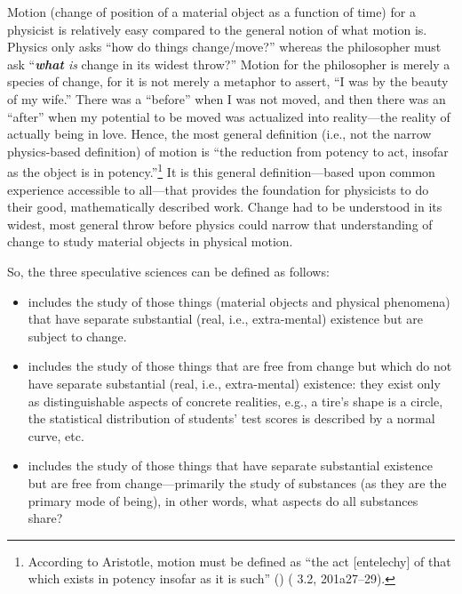 \label{page:motion}Motion (change of position of a material object as a function of time) for a physicist is relatively easy compared to the general notion of what motion is. Physics only asks ``how do things change/move?'' whereas the philosopher must ask ``\textit{\textbf{what} is} change in its widest throw?'' Motion for the philosopher is merely a species of change, for it is not merely a metaphor to assert, ``I was  by the beauty of my wife.'' There was a ``before'' when I was not moved, and then there was an ``after'' when my potential to be moved was actualized into reality---the reality of actually being in love. Hence, the most general definition (i.e., not the narrow physics-based definition) of motion is ``the reduction from potency to act, insofar as the object is in potency.''\footnote{According to Aristotle, motion must be defined as ``the act [entelechy] of that which exists in potency insofar as it is such'' () ( 3.2, 201a27--29).} It is this general definition---based upon common experience accessible to all---that provides the foundation for physicists to do their good, mathematically described work. Change had to be understood in its widest, most general throw before physics could narrow that understanding of change to study material objects in physical motion.

So, the three speculative sciences can be defined as follows:

\begin{itemize}
\item {} includes the study of those things (material objects and physical phenomena) that have separate substantial (real, i.e., extra-mental) existence but are subject to change.
\item {} includes the study of those things that are free from change but which do not have separate substantial (real, i.e., extra-mental) existence: they exist only as distinguishable aspects of concrete realities, e.g., a tire's shape is a circle, the statistical distribution of students' test scores is described by a normal curve, etc.
\item {} includes the study of those things that have separate substantial existence but are free from change---primarily the study of substances (as they are the primary mode of being), in other words, what aspects do all substances share?
\end{itemize}


